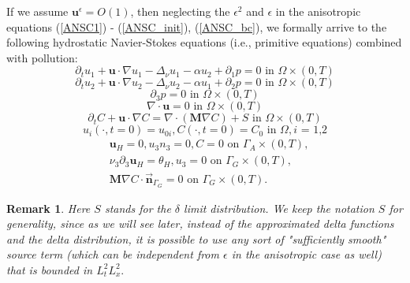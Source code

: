\documentclass[11pt]{article}
\newtheorem{remark}{Remark}
\begin{document}
If we assume $\mathbf{u}^\epsilon = O(1)$, then neglecting the $\epsilon^2$ and $\epsilon$ in the anisotropic equations (\ref{ANSC1}) - (\ref{ANSC_init}), (\ref{ANSC_bc}), we formally arrive to the following hydrostatic Navier-Stokes equations (i.e., primitive equations) combined with pollution:
%
\begin{equation} \label{HNSC1}
\partial_t u_1 + \mathbf{u} \cdot \nabla u_1 - \Delta_\nu u_1 -\alpha u_2 + \partial_1 p = 0 \text{ in } \Omega \times (0,T)
\end{equation}
%
\begin{equation} \label{HNSC2}
\partial_t u_2 + \mathbf{u} \cdot \nabla u_2 - \Delta_\nu u_2 -\alpha u_1 + \partial_2 p = 0 \text{ in } \Omega \times (0,T)
\end{equation}
%
\begin{equation} \label{HNSC3}
\partial_3 p = 0 \text{ in } \Omega \times (0,T)
\end{equation}
%
\begin{equation} \label{HNSC4}
\nabla \cdot \mathbf{u} = 0 \text{ in } \Omega \times (0,T)
\end{equation}
%
\begin{equation} \label{HNSC5}
\partial_t C + \mathbf{u} \cdot \nabla C = \nabla \cdot (\mathbf{M} \nabla C) + S \text{ in } \Omega \times (0,T)
\end{equation}
%
\begin{equation} \label{HNSC_init}
u_i (\cdot, t=0) = u_{0 i}, C (\cdot, t=0) = C_0 \text{ in } \Omega, \text{$i$ = 1,2}
\end{equation}
%
\begin{equation} \label{HNSC_bc}
\begin{split}
& \mathbf{u}_H = 0, u_3 n_3 = 0, C = 0 \text{ on } \Gamma_A \times (0,T), \\
& \nu_3 \partial_3 \mathbf{u}_H = \theta_H, u_3 = 0 \text{ on } \Gamma_G \times (0,T), \\
& \mathbf{M} \nabla C \cdot \vec{\boldsymbol{n}}_{\Gamma_G} = 0 \text{ on } \Gamma_G \times (0,T).
\end{split}
\end{equation}
%
\begin{remark} \label{sourceregularityremark}
Here $S$ stands for the $\delta$ limit distribution. We keep the notation $S$ for generality, since as we will see later, instead of the approximated delta functions and the delta distribution, it is possible to use any sort of "sufficiently smooth" source term (which can be independent from $\epsilon$ in the anisotropic case as well) that is bounded in $L^2_t L^2_x.$
\end{remark}
\end{document}
